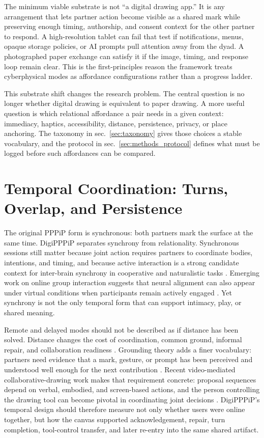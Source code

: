 \documentclass[
  english,
]{article}
\begin{document}
The minimum viable substrate is not ``a digital drawing app.'' It is any
arrangement that lets partner action become visible as a shared mark
while preserving enough timing, authorship, and consent context for the
other partner to respond. A high-resolution tablet can fail that test if
notifications, menus, opaque storage policies, or AI prompts pull
attention away from the dyad. A photographed paper exchange can satisfy
it if the image, timing, and response loop remain clear. This is the
first-principles reason the framework treats cyberphysical modes as
affordance configurations rather than a progress ladder.

This substrate shift changes the research problem. The central question
is no longer whether digital drawing is equivalent to paper drawing. A
more useful question is which relational affordance a pair needs in a
given context: immediacy, haptics, accessibility, distance, persistence,
privacy, or place anchoring. The taxonomy in sec.~\ref{sec:taxonomy}
gives those choices a stable vocabulary, and the protocol in
sec.~\ref{sec:methods_protocol} defines what must be logged before such
affordances can be compared.

\newpage

\section{Temporal Coordination: Turns, Overlap, and
Persistence}\label{sec:temporal}

The original PPPiP form is synchronous: both partners mark the surface
at the same time. DigiPPPiP separates synchrony from relationality.
Synchronous sessions still matter because joint action requires partners
to coordinate bodies, intentions, and timing, and because active
interaction is a strong candidate context for inter-brain synchrony in
cooperative and naturalistic tasks
\citep{sebanz2006joint, czeszumski2020hyperscanning, czeszumski2022cooperative}.
Emerging work on online group interaction suggests that neural alignment
can also appear under virtual conditions when participants remain
actively engaged \citep{azhari2025online}. Yet synchrony is not the only
temporal form that can support intimacy, play, or shared meaning.

Remote and delayed modes should not be described as if distance has been
solved. Distance changes the cost of coordination, common ground,
informal repair, and collaboration readiness \citep{olson2000distance}.
Grounding theory adds a finer vocabulary: partners need evidence that a
mark, gesture, or prompt has been perceived and understood well enough
for the next contribution \citep{clark1991grounding}. Recent
video-mediated collaborative-drawing work makes that requirement
concrete: proposal sequences depend on verbal, embodied, and
screen-based actions, and the person controlling the drawing tool can
become pivotal in coordinating joint decisions
\citep{oittinen2025videodrawing}. DigiPPPiP's temporal design should
therefore measure not only whether users were online together, but how
the canvas supported acknowledgement, repair, turn completion,
tool-control transfer, and later re-entry into the same shared artifact.
\end{document}

